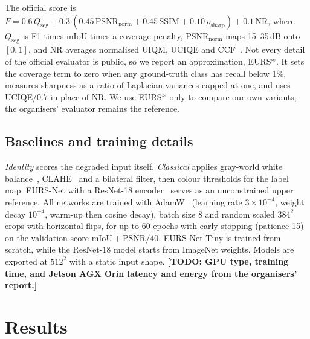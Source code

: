 \documentclass[10pt,twocolumn,letterpaper]{article}
\newcommand{\todo}[1]{{\color{red!75!black}\textbf{[TODO: #1]}}}
\newcommand{\todo}[1]{\errmessage{Unresolved TODO: #1}}
\newcommand{\ours}{EURS-Net}
\newcommand{\tinynet}{EURS-Net-Tiny}
\begin{document}
The official score is
$F=0.6\,Q_\mathrm{seg}+0.3\,(0.45\,\mathrm{PSNR}_\mathrm{norm}+0.45\,\mathrm{SSIM}+0.10\,\rho_\mathrm{sharp})+0.1\,\mathrm{NR}$,
where $Q_\mathrm{seg}$ is F1 times mIoU times a coverage penalty, $\mathrm{PSNR}_\mathrm{norm}$ maps 15--35\,dB onto
$[0,1]$, and NR averages normalised UIQM, UCIQE and CCF~\cite{eurs2027challenge}. Not every detail of the official
evaluator is public, so we report an approximation, EURS$^{\approx}$. It sets the coverage term to zero when any
ground-truth class has recall below 1\%, measures sharpness as a ratio of Laplacian variances capped at one, and
uses UCIQE$/0.7$ in place of NR. We use EURS$^{\approx}$ only to compare our own variants; the organisers' evaluator
remains the reference.

\subsection{Baselines and training details}
\emph{Identity} scores the degraded input itself. \emph{Classical} applies gray-world white
balance~\cite{buchsbaum1980spatial}, CLAHE~\cite{zuiderveld1994clahe} and a bilateral filter, then colour
thresholds for the label map. \ours{} with a ResNet-18 encoder~\cite{he2016resnet} serves as an unconstrained
upper reference. All networks are trained with AdamW~\cite{loshchilov2019adamw} (learning rate
$3{\times}10^{-4}$, weight decay $10^{-4}$, warm-up then cosine decay), batch size 8 and random scaled $384^2$
crops with horizontal flips, for up to 60 epochs with early stopping (patience 15) on the validation score
$\mathrm{mIoU}+\mathrm{PSNR}/40$. \tinynet{} is trained from scratch, while the ResNet-18 model starts from ImageNet
weights. Models are exported at $512^2$ with a static input shape. \todo{GPU type, training time, and Jetson AGX
Orin latency and energy from the organisers' report.}

\section{Results}
\begin{table}[t]
\centering\small

\caption{Model size and compute at $1{\times}3{\times}512{\times}512$, measured with our counter (FLOPs $=2\times$
multiply--accumulates of convolution and linear layers). EURS Track 2 allows $\le$1.0\,M parameters and
$\le$12\,GFLOPs; run the official checker before submitting.}
\label{tab:budget}
\end{table}
\end{document}
